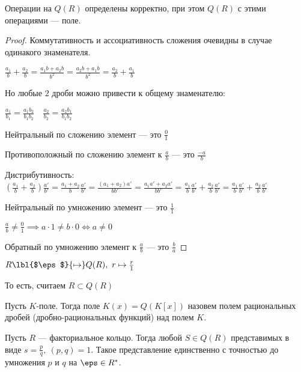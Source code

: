 \begin{theorem-non}
    Операции на $Q(R)$ определены корректно, при этом $Q(R)$ с этими операциями --- поле.
\end{theorem-non}

\begin{proof}
    Коммутативность и ассоциативность сложения очевидны в случае одинакого знаменателя.

    $\frac{a_1}{b} + \frac{a_2}{b} = \frac{a_1 b + a_2 b}{b^2} = \frac{a_2 b + a_1 b}{b^2} = \frac{a_2}{b} + \frac{a_1}{b}$

    Но любые $2$ дроби можно привести к общему знаменателю:

    $\frac{a_1}{b_1} = \frac{a_1 b_2}{b_1 b_2} \quad \frac{a_2}{b_2} = \frac{a_2 b_1}{b_1 b_2}$

    Нейтральный по сложению элемент --- это $\frac{0}{1}$

    Противоположный по сложению элемент к $\frac{a}{b}$ --- это $\frac{-a}{b}$

    Дистрибутивность: $\left( \frac{a_1}{b} + \frac{a_2}{b} \right) \frac{a'}{b'} = \frac{a_1 + a_2}{b} \frac{a'}{b'} = \frac{(a_1 + a_2) a'}{b b'} = \frac{a_1a' + a_2a'}{b b'} = \frac{a_1}{b} \frac{a'}{b'} + \frac{a_2}{b} \frac{a'}{b'} = \frac{a_1}{b} \frac{a'}{b'} + \frac{a_2}{b} \frac{a'}{b'}$

    Нейтральный по умножению элемент --- это $\frac{1}{1}$

    $\frac{a}{b} \neq \frac{0}{1} \implies a \cdot 1 \neq b \cdot 0 \iff a \neq 0$

    Обратный по умножению элемент к $\frac{a}{b}$ --- это $\frac{b}{a}$
\end{proof}

$R \lbl{$\eps$}{\mapsto} Q(R),~ r \mapsto \frac{r}{1}$

То есть, считаем $R \subset Q(R)$

\begin{defn}
    Пусть $K$-поле. Тогда поле $K(x) = Q(K[x])$ назовем полем рациональных дробей (дробно-рациональных функций) над полем $K$.
\end{defn}

\begin{theorem-non}
    Пусть $R$ --- факториальное кольцо. Тогда любой $S \in Q(R)$ представимых в виде $s = \frac{p}{q},~(p, q) = 1$. Такое представление единственно с точностью до умножения $p$ и $q$ на $\eps \in R^*$.
\end{theorem-non}

